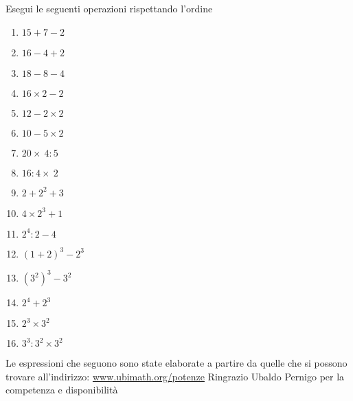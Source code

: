 
\subsubsection*{}

\begin{esercizio}
Esegui le seguenti operazioni rispettando l'ordine
 \begin{multicols}{4}
 \begin{enumerate}[noitemsep, label=(\alph*)]
 \item \(15+7-2\)
 \item \(16-4+2\)
 \item \(18-8-4\)
 \item \(16\times 2-2\)
 \item \(12-2\times 2\)
 \item \(10-5\times 2\)
 \item \(20\times~4:5\)
 \item \(16:4\times~2\)
 \item \(2+2^2+3\)
 \item \(4\times 2^3+1\)
 \item \(2^4:2-4\)
 \item \((1+2)^3-2^3\)
 \item \((3^2)^3-3^2\)
 \item \(2^4+2^3\)
 \item \(2^3\times3^2\)
 \item \(3^3:3^2\times3^2\)
 \end{enumerate}
 \end{multicols}
\end{esercizio}


Le espressioni che seguono sono state elaborate a partire da quelle che si 
possono trovare all'indirizzo:
\href{http:// www.ubimath.org/potenze}{ www.ubimath.org/potenze}
Ringrazio Ubaldo Pernigo per la competenza e disponibilità

